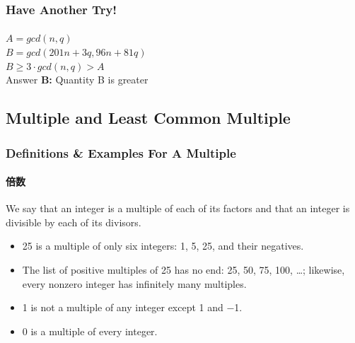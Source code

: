 \documentclass[
	11pt, %
	handout,
]{beamer}
\begin{document}

\begin{frame}
	\frametitle{Have Another Try!}
	\framesubtitle{}
	$A = gcd(n, q)$ \\
	
	\bigskip
  $B = gcd(201n + 3q, 96n + 81q)$ \\
\bigskip
\pause
$B \geq 3 \cdot gcd(n, q) > A$\\
Answer \textbf{B: } Quantity B is greater
\end{frame}


\subsection{Multiple and Least Common Multiple}


\begin{frame}
	\frametitle{Definitions \& Examples For A Multiple}
	\framesubtitle{倍数}
	\begin{definition}
		We say that an integer is a multiple of each of its factors and that an integer is
divisible by each of its divisors.
	\end{definition}
	
	\smallskip %
	
	\begin{example}
		\begin{itemize}
			\item 25 is a multiple of only six integers: 1, 5, 25, and their \alert{negatives}.
			\item The list of positive multiples of 25 has no end: 25, 50, 75, 100, …; likewise, every nonzero integer has infinitely many multiples.
			\item 1 is \alert{not} a multiple of any integer except 1 and −1.
			\item 0 is a multiple of every integer.
		\end{itemize}
	\end{example}
	
\end{frame}

\end{document}
